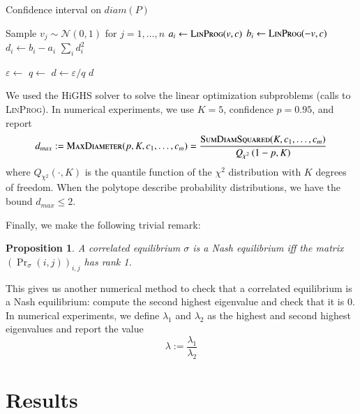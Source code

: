\documentclass[preprint,12pt,authoryear]{elsarticle}
\newtheorem{proposition}[theorem]{Proposition}
\theoremstyle{definition}
\begin{document}
\begin{algorithm}
\label{alg:diameters}
\caption{Confidence interval on $diam(P)$}
\begin{algorithmic}
    \State Sample $v_j \sim \mathcal{N}(0, 1)$ for $j=1,\ldots,n$
    \State $a_i \gets \textsc{LinProg}(v, c)$ 
    \State $b_i \gets \textsc{LinProg}(-v, c)$ 
    \State $d_i \gets b_i - a_i$
\EndFor
\State \Return $\sum_i d_i^2$
\EndFunction
{}

\State $\varepsilon \gets$ 
\State $q \gets$ 
\State $d \gets \varepsilon / q$
\State \Return $d$
\EndFunction
\end{algorithmic}
\end{algorithm}

We used the HiGHS solver \citep{huangfu2018parallelizing} to solve the linear optimization subproblems (calls to \textsc{LinProg}). In numerical experiments, we use $K=5$, confidence $p=0.95$, and report $$d_{max} :=  \textsc{MaxDiameter}(p, K, c_1, \ldots, c_m) = \frac{\textsc{SumDiamSquared}(K, c_1, \ldots, c_m)} {Q_{\chi^2}\left(1-p, K\right)}$$ where $Q_{\chi^2}(\cdot, K)$ is the quantile function of the $\chi^2$ distribution with $K$ degrees of freedom. When the polytope describe probability distributions, we have the bound $d_{max} \leq 2$.

Finally, we make the following trivial remark:

\begin{proposition}
    A correlated equilibrium $\sigma$ is a Nash equilibrium iff the matrix $(\Pr\nolimits_\sigma(i, j))_{i,j}$ has rank 1.
\end{proposition}

This gives us another numerical method to check that a correlated equilibrium is a Nash equilibrium: compute the second highest eigenvalue and check that it is $0$. In numerical experiments, we define $\lambda_1$ and $\lambda_2$ as the highest and second highest eigenvalues and report the value $$\lambda := \frac{\lambda_1}{\lambda_2}$$



\section{Results}
\end{document}
